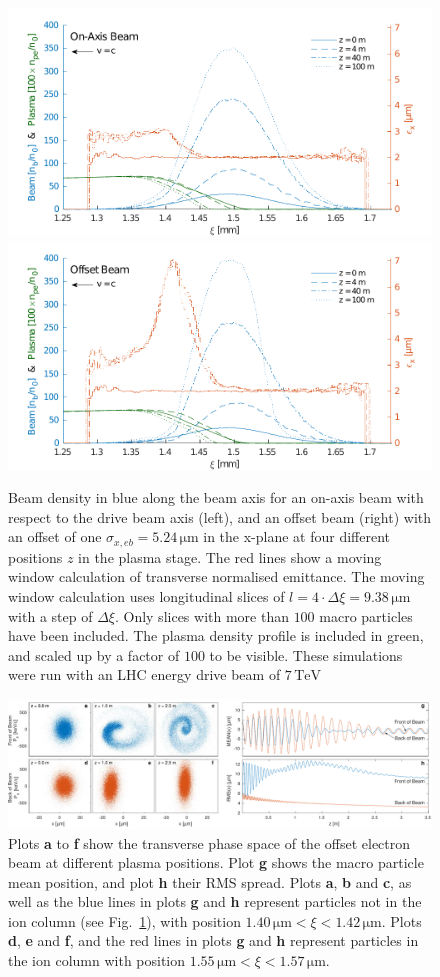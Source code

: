 \documentclass[aps,prstab,reprint,amsmath,amssymb,groupedaddress]{revtex4-1}
\newcommand{\unit}[1]{\,\mathrm{#1}}
\begin{document}
\begin{figure}[hbt]
    \includegraphics[width=0.495\linewidth,trim={2mm 0mm 2mm 0mm},clip]{figures/beamEmittance}
    \includegraphics[width=0.495\linewidth,trim={2mm 0mm 2mm 0mm},clip]{figures/beamEmittanceOffset}
    \caption{\label{Fig:BeamEmitt} Beam density in blue along the beam axis for an on-axis beam with respect to the
        drive beam axis (left), and an offset beam (right) with an offset of one $\sigma_{x,eb} = 5.24\unit{\mu m}$ in
        the x-plane \textendash at four different positions $z$ in the plasma stage. The red lines show a moving window
        calculation of transverse normalised emittance. The moving window calculation uses longitudinal slices of
        $l = 4\cdot\Delta\xi = 9.38\unit{\mu m}$ with a step of $\Delta\xi$. Only slices with more than $100$ macro
        particles have been included. The plasma density profile is included in green, and scaled up by a factor of
        $100$ to be visible. These simulations were run with an LHC energy drive beam of $7\unit{TeV}$}
\end{figure}

\begin{figure}[hbt]
    \includegraphics[width=\linewidth,trim={0mm 0mm 0mm 0mm},clip]{figures/beamFilamentationAll}
    \caption{\label{Fig:BeamFilament} Plots \textbf{a} to \textbf{f} show the transverse phase space of the offset
        electron beam at different plasma positions. Plot \textbf{g} shows the macro particle mean position, and plot
        \textbf{h} their RMS spread. Plots \textbf{a}, \textbf{b} and \textbf{c}, as well as the blue lines in plots
        \textbf{g} and \textbf{h} represent particles not in the ion column (see Fig.~\ref{Fig:BeamEmitt}), with
        position $1.40\unit{\mu m} < \xi < 1.42\unit{\mu m}$. Plots \textbf{d}, \textbf{e} and \textbf{f}, and the red
        lines in plots \textbf{g} and \textbf{h} represent particles in the ion column with position
        $1.55\unit{\mu m} < \xi < 1.57\unit{\mu m}$.}
\end{figure}
\end{document}
